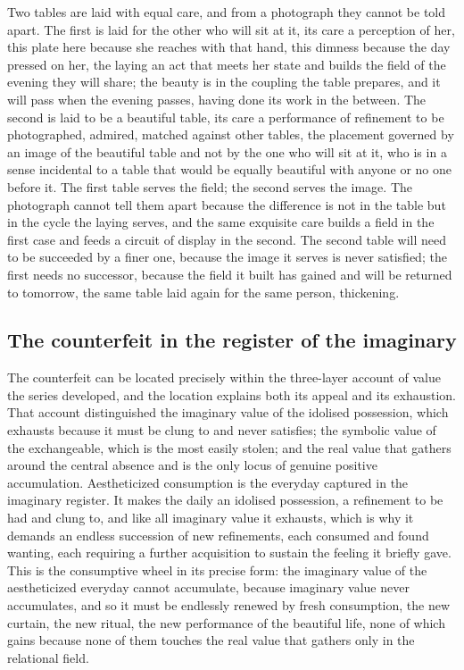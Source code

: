 \begin{casebox}
Two tables are laid with equal care, and from a photograph they cannot be told apart. The first is laid for the other who will sit at it, its care a perception of her, this plate here because she reaches with that hand, this dimness because the day pressed on her, the laying an act that meets her state and builds the field of the evening they will share; the beauty is in the coupling the table prepares, and it will pass when the evening passes, having done its work in the between. The second is laid to be a beautiful table, its care a performance of refinement to be photographed, admired, matched against other tables, the placement governed by an image of the beautiful table and not by the one who will sit at it, who is in a sense incidental to a table that would be equally beautiful with anyone or no one before it. The first table serves the field; the second serves the image. The photograph cannot tell them apart because the difference is not in the table but in the cycle the laying serves, and the same exquisite care builds a field in the first case and feeds a circuit of display in the second. The second table will need to be succeeded by a finer one, because the image it serves is never satisfied; the first needs no successor, because the field it built has gained and will be returned to tomorrow, the same table laid again for the same person, thickening.
\end{casebox}

\subsection{The counterfeit in the register of the imaginary}
\label{p22:sub:fetish-imaginary}

The counterfeit can be located precisely within the three-layer account of value the series developed, and the location explains both its appeal and its exhaustion. That account distinguished the imaginary value of the idolised possession, which exhausts because it must be clung to and never satisfies; the symbolic value of the exchangeable, which is the most easily stolen; and the real value that gathers around the central absence and is the only locus of genuine positive accumulation. Aestheticized consumption is the everyday captured in the imaginary register. It makes the daily an idolised possession, a refinement to be had and clung to, and like all imaginary value it exhausts, which is why it demands an endless succession of new refinements, each consumed and found wanting, each requiring a further acquisition to sustain the feeling it briefly gave. This is the consumptive wheel in its precise form: the imaginary value of the aestheticized everyday cannot accumulate, because imaginary value never accumulates, and so it must be endlessly renewed by fresh consumption, the new curtain, the new ritual, the new performance of the beautiful life, none of which gains because none of them touches the real value that gathers only in the relational field.

